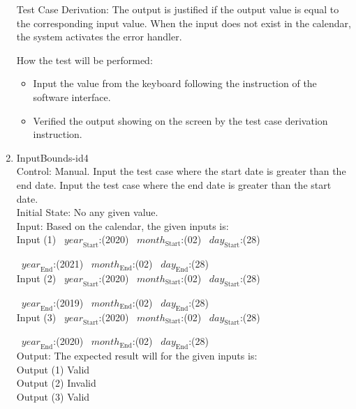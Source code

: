 \documentclass[12pt, titlepage]{article}
\begin{document}
\begin{enumerate}

Test Case Derivation: The output is justified if the output value is equal to
the corresponding input value. When the input does not exist in the calendar, the system activates the error handler. \\


How the test will be performed:
\begin{itemize} 
\item Input the value from the keyboard following the instruction of the
software interface. 
\item Verified the output showing on the screen by the test case derivation
 instruction. 
\end{itemize}

\item{InputBounds-id4\\}
Control: Manual. Input the test case where the start date is greater than the end date. Input the test case where the end date is greater than the start date.\\
 
Initial State: No any given value.\\
Input: Based on the calendar, the given inputs is:\\ 
Input (1)
~$\mathit{year}_\text{Start}$:(2020)
~$\mathit{month}_\text{Start}$:(02) ~$\mathit{day}_\text{Start}$:(28)

~$\mathit{year}_\text{End}$:(2021)
~$\mathit{month}_\text{End}$:(02) ~$\mathit{day}_\text{End}$:(28)\\

Input (2) ~$\mathit{year}_\text{Start}$:(2020)
~$\mathit{month}_\text{Start}$:(02) ~$\mathit{day}_\text{Start}$:(28)

~$\mathit{year}_\text{End}$:(2019)
~$\mathit{month}_\text{End}$:(02) ~$\mathit{day}_\text{End}$:(28)\\

Input (3) ~$\mathit{year}_\text{Start}$:(2020)
~$\mathit{month}_\text{Start}$:(02) ~$\mathit{day}_\text{Start}$:(28)

~$\mathit{year}_\text{End}$:(2020)
~$\mathit{month}_\text{End}$:(02) ~$\mathit{day}_\text{End}$:(28)\\

Output: The expected result will for the given inputs is:\\ 
Output (1) Valid\\ 
Output (2) Invalid\\
Output (3) Valid\\ 


\end{enumerate}
\end{document}
